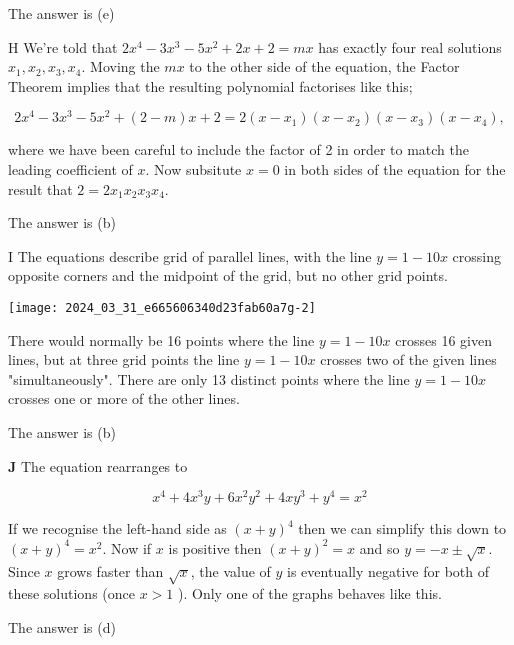 \documentclass[10pt]{article}
\begin{document}
The answer is (e)

H We're told that $2 x^{4}-3 x^{3}-5 x^{2}+2 x+2=m x$ has exactly four real solutions $x_{1}, x_{2}, x_{3}, x_{4}$. Moving the $m x$ to the other side of the equation, the Factor Theorem implies that the resulting polynomial factorises like this;

$$
2 x^{4}-3 x^{3}-5 x^{2}+(2-m) x+2=2\left(x-x_{1}\right)\left(x-x_{2}\right)\left(x-x_{3}\right)\left(x-x_{4}\right),
$$

where we have been careful to include the factor of 2 in order to match the leading coefficient of $x$. Now subsitute $x=0$ in both sides of the equation for the result that $2=2 x_{1} x_{2} x_{3} x_{4}$.

The answer is (b)

I The equations describe grid of parallel lines, with the line $y=1-10 x$ crossing opposite corners and the midpoint of the grid, but no other grid points.

\begin{center}
\texttt{[image: 2024\_03\_31\_e665606340d23fab60a7g-2]}
\end{center}

There would normally be 16 points where the line $y=1-10 x$ crosses 16 given lines, but at three grid points the line $y=1-10 x$ crosses two of the given lines "simultaneously". There are only 13 distinct points where the line $y=1-10 x$ crosses one or more of the other lines.

The answer is (b)

$\mathbf{J}$ The equation rearranges to

$$
x^{4}+4 x^{3} y+6 x^{2} y^{2}+4 x y^{3}+y^{4}=x^{2}
$$

If we recognise the left-hand side as $(x+y)^{4}$ then we can simplify this down to $(x+y)^{4}=x^{2}$. Now if $x$ is positive then $(x+y)^{2}=x$ and so $y=-x \pm \sqrt{x}$. Since $x$ grows faster than $\sqrt{x}$, the value of $y$ is eventually negative for both of these solutions (once $x>1$ ). Only one of the graphs behaves like this.

The answer is (d)
\end{document}
